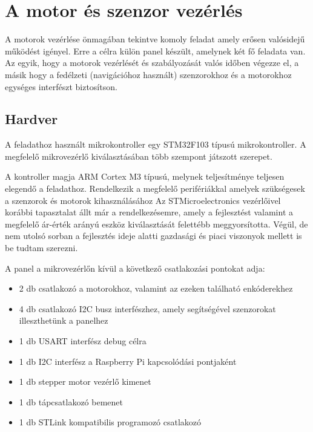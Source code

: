 
\section{A motor és szenzor vezérlés}

A motorok vezérlése önmagában tekintve komoly feladat amely erősen valósidejű működést igényel. Erre a célra külön panel készült, amelynek két fő feladata van. Az egyik, hogy a motorok vezérlését és szabályozását valós időben
végezze el, a másik hogy a fedélzeti (navigációhoz használt) szenzorokhoz és a motorokhoz egységes interfészt biztosítson.

\subsection{Hardver}

A feladathoz használt mikrokontroller egy STM32F103 típusú mikrokontroller. A megfelelő mikrovezérlő kiválasztásában több szempont játszott szerepet.

A kontroller magja ARM Cortex M3 típusú, melynek teljesítménye teljesen elegendő a feladathoz. Rendelkezik a megfelelő perifériákkal amelyek szükségesek a szenzorok és motorok kihasználásához Az STMicroelectronics vezérlőivel
korábbi tapasztalat állt már a rendelkezésemre, amely a fejlesztést valamint a megfelelő ár-érték arányú eszköz kiválasztását felettébb meggyorsította. Végül, de nem utolsó sorban a fejlesztés ideje alatti gazdasági és piaci
viszonyok mellett is be tudtam szerezni.

A panel a mikrovezérlőn kívül a következő csatlakozási pontokat adja:

\begin{itemize}
\item 2 db csatlakozó a motorokhoz, valamint az ezeken található enkóderekhez
\item 4 db csatlakozó I2C busz interfészhez, amely segítségével szenzorokat illeszthetünk a panelhez
\item 1 db USART interfész debug célra
\item 1 db I2C interfész a Raspberry Pi kapcsolódási pontjaként
\item 1 db stepper motor vezérlő kimenet
\item 1 db tápcsatlakozó bemenet
\item 1 db STLink kompatibilis programozó csatlakozó
\end{itemize}


